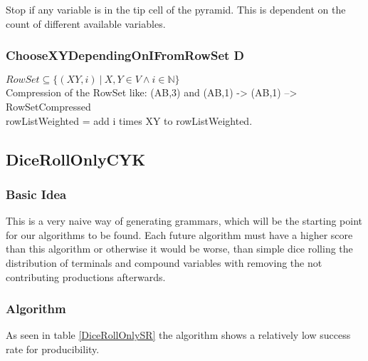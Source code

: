 Stop if any variable is in the tip cell of the pyramid. This is dependent on the count of different available variables. 

\subsubsection{ChooseXYDependingOnIFromRowSet D}
$RowSet \subseteq \{(XY,i)\ |\ X,Y \in V \wedge i \in \mathbb{N} \}$\\
Compression of the RowSet like: (AB,3) and (AB,1) -> (AB,1) --> RowSetCompressed\\
rowListWeighted = add i times XY to rowListWeighted.

\pagebreak
\subsection{DiceRollOnlyCYK}
\subsubsection{Basic Idea}
\noindent This is a very naive way of generating grammars, which will be the starting point for our algorithms to be found. Each future algorithm must have a higher score than this algorithm or otherwise it would be worse, than simple dice rolling the distribution of terminals and compound variables with removing the not contributing productions afterwards.
\subsubsection{Algorithm}

\noindent
{}
As seen in table \ref{DiceRollOnlySR} the algorithm shows a relatively low success rate for producibility.

